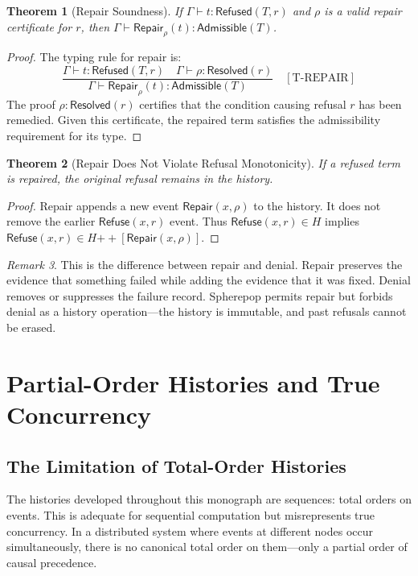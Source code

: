 \documentclass[12pt, a4paper, openany]{book}
\theoremstyle{plain}
\newtheorem{theorem}{Theorem}[chapter]
\theoremstyle{definition}
\theoremstyle{remark}
\newtheorem{remark}[theorem]{Remark}
\newcommand{\Refuse}{\mathsf{Refuse}}
\newcommand{\Adm}{\mathsf{Admissible}}
\newcommand{\Rfsd}{\mathsf{Refused}}
\begin{document}
\begin{theorem}[Repair Soundness]
If $\Gamma \vdash t : \Rfsd(T, r)$ and $\rho$ is a valid repair certificate for
$r$, then $\Gamma \vdash \mathsf{Repair}_\rho(t) : \Adm(T)$.
\end{theorem}

\begin{proof}
The typing rule for repair is:
\[
\frac{\Gamma \vdash t : \Rfsd(T, r) \quad \Gamma \vdash \rho : \mathsf{Resolved}(r)}
     {\Gamma \vdash \mathsf{Repair}_\rho(t) : \Adm(T)}
\quad [\mathrm{T\text{-}REPAIR}]
\]
The proof $\rho : \mathsf{Resolved}(r)$ certifies that the condition causing
refusal $r$ has been remedied. Given this certificate, the repaired term
satisfies the admissibility requirement for its type.
\end{proof}

\begin{theorem}[Repair Does Not Violate Refusal Monotonicity]
If a refused term is repaired, the original refusal remains in the history.
\end{theorem}

\begin{proof}
Repair appends a new event $\mathsf{Repair}(x, \rho)$ to the history.
It does not remove the earlier $\Refuse(x, r)$ event. Thus
$\Refuse(x, r) \in H$ implies $\Refuse(x, r) \in H \mathbin{++}
[\mathsf{Repair}(x, \rho)]$.
\end{proof}

\begin{remark}
This is the difference between repair and denial. Repair preserves the evidence
that something failed while adding the evidence that it was fixed. Denial removes
or suppresses the failure record. Spherepop permits repair but forbids denial as
a history operation---the history is immutable, and past refusals cannot be
erased.
\end{remark}

\chapter{Partial-Order Histories and True Concurrency}

\section{The Limitation of Total-Order Histories}

The histories developed throughout this monograph are sequences: total orders
on events. This is adequate for sequential computation but misrepresents true
concurrency. In a distributed system where events at different nodes occur
simultaneously, there is no canonical total order on them---only a partial
order of causal precedence.
\end{document}
